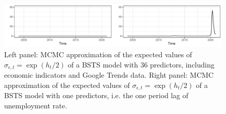 \documentclass[
  12pt,
]{book}
\theoremstyle{break}
\theoremstyle{nonumberplain}
\begin{document}
\begin{figure}[h]

{\centering \includegraphics{Dynamic-Shrinkage-in-Bayesian-Structural-Time-Series-and-Vector-Autoregressive-Models_files/figure-latex/myfig501-1} 

}

\caption{Left panel: MCMC approximation of the expected values of $\sigma_{\epsilon,t}=\exp(h_t/2)$ of a BSTS model with 36 predictors, including economic indicators and Google Trends data. Right panel: MCMC approximation of the expected values of $\sigma_{\epsilon,t}=\exp(h_t/2)$ of a BSTS model with one predictors, i.e. the one period lag of unemployment rate.}\label{fig:myfig501}
\end{figure}
\end{document}
